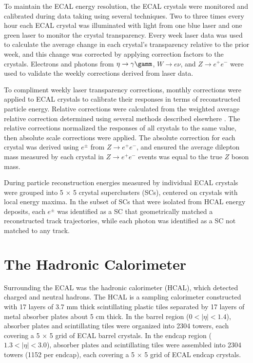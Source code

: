 To maintain the ECAL energy resolution, the ECAL crystals were monitored and calibrated 
during data taking using several techniques.  Two to three times every hour each ECAL crystal was illuminated 
with light from one blue laser and one green laser to monitor the crystal transparency.  Every week laser data 
was used to calculate the average change in each crystal's transparency relative to the prior week, and this change 
was corrected by applying correction factors to the crystals.  Electrons and photons from $\eta \rightarrow \gamma\gamm$, 
$W \rightarrow e\nu$, and $Z \rightarrow e^{+}e^{-}$ were used to validate the weekly corrections derived from laser data.

To compliment weekly laser transparency corrections, monthly corrections were applied to ECAL crystals 
to calibrate their responses in terms of reconstructed particle energy.  Relative corrections were calculated from 
the weighted average relative correction determined using several methods described elsewhere \cite{eGammaMonitCalib2011}.  
The relative corrections normalized the responses of all crystals to the same value, then absolute scale corrections 
were applied.  The absolute correction for each crystal was derived using $e^{\pm}$ from $Z \rightarrow e^{+}e^{-}$, 
and ensured the average dilepton mass measured by each crystal in $Z \rightarrow e^{+}e^{-}$ events was equal to the 
true $Z$ boson mass.

During particle reconstruction energies measured by individual ECAL crystals were grouped into 5 $\times$ 5 crystal superclusters 
(SCs), centered on crystals with local energy maxima.  In the subset of SCs that were isolated 
from HCAL energy deposits, each $e^{\pm}$ was identified as a SC that geometrically matched a reconstructed track 
trajectories, while each photon was identified as a SC not matched to any track.


\section{The Hadronic Calorimeter}
\label{sec:hcalDescription}
Surrounding the ECAL was the hadronic calorimeter (HCAL), which detected charged and neutral hadrons.  The 
HCAL is a sampling calorimeter constructed with 17 layers of 3.7 mm thick scintillating plastic tiles separated by 
17 layers of metal absorber plates about 5 cm thick.  In the barrel 
region ($0 < |\eta| < 1.4$), absorber plates and scintillating tiles were organized into 2304 towers, each 
covering a 5 $\times$ 5 grid of ECAL barrel crystals.  In the endcap region ($1.3 < |\eta| < 3.0$), absorber 
plates and scintillating tiles were assembled into 2304 towers (1152 per endcap), each covering 
a 5 $\times$ 5 grid of ECAL endcap crystals.

